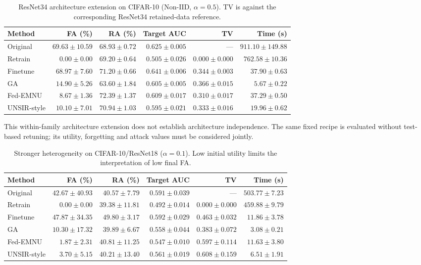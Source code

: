 \begin{table}[H]
\caption{ResNet34 architecture extension on CIFAR-10 (Non-IID, $\alpha=0.5$). TV is against the corresponding ResNet34 retained-data reference.}
\label{tab:r34-noniid}
\centering\scriptsize\setlength{\tabcolsep}{3.5pt}
\begin{tabular}{lrrrrr}
\toprule
Method & FA (\%) & RA (\%) & Target AUC & TV & Time (s)\\
\midrule
Original & $69.63 \pm 10.59$ & $68.93 \pm 0.72$ & $0.625 \pm 0.005$ & --- & $911.10 \pm 149.88$\\
Retrain & $0.00 \pm 0.00$ & $69.20 \pm 0.64$ & $0.505 \pm 0.026$ & $0.000 \pm 0.000$ & $762.58 \pm 10.36$\\
Finetune & $68.97 \pm 7.60$ & $71.20 \pm 0.66$ & $0.641 \pm 0.006$ & $0.344 \pm 0.003$ & $37.90 \pm 0.63$\\
GA & $14.90 \pm 5.26$ & $63.60 \pm 1.84$ & $0.605 \pm 0.005$ & $0.366 \pm 0.015$ & $5.67 \pm 0.22$\\
Fed-EMNU & $8.67 \pm 1.36$ & $72.39 \pm 1.37$ & $0.609 \pm 0.017$ & $0.310 \pm 0.017$ & $37.29 \pm 0.50$\\
UNSIR-style & $10.10 \pm 7.01$ & $70.94 \pm 1.03$ & $0.595 \pm 0.021$ & $0.333 \pm 0.016$ & $19.96 \pm 0.62$\\
\bottomrule
\end{tabular}
\end{table}

This within-family architecture extension does not establish architecture independence. The same fixed recipe is evaluated without test-based retuning; its utility, forgetting and attack values must be considered jointly.

\begin{table}[H]
\caption{Stronger heterogeneity on CIFAR-10/ResNet18 ($\alpha=0.1$). Low initial utility limits the interpretation of low final FA.}
\label{tab:alpha01}
\centering\scriptsize\setlength{\tabcolsep}{3.5pt}
\begin{tabular}{lrrrrr}
\toprule
Method & FA (\%) & RA (\%) & Target AUC & TV & Time (s)\\
\midrule
Original & $42.67 \pm 40.93$ & $40.57 \pm 7.79$ & $0.591 \pm 0.039$ & --- & $503.77 \pm 7.23$\\
Retrain & $0.00 \pm 0.00$ & $39.38 \pm 11.81$ & $0.492 \pm 0.014$ & $0.000 \pm 0.000$ & $459.88 \pm 9.79$\\
Finetune & $47.87 \pm 34.35$ & $49.80 \pm 3.17$ & $0.592 \pm 0.029$ & $0.463 \pm 0.032$ & $11.86 \pm 3.78$\\
GA & $10.30 \pm 17.32$ & $39.89 \pm 6.67$ & $0.558 \pm 0.044$ & $0.383 \pm 0.072$ & $3.08 \pm 0.21$\\
Fed-EMNU & $1.87 \pm 2.31$ & $40.81 \pm 11.25$ & $0.547 \pm 0.010$ & $0.597 \pm 0.114$ & $11.63 \pm 3.80$\\
UNSIR-style & $3.70 \pm 5.15$ & $40.21 \pm 13.40$ & $0.561 \pm 0.019$ & $0.608 \pm 0.159$ & $6.51 \pm 1.91$\\
\bottomrule
\end{tabular}
\end{table}

